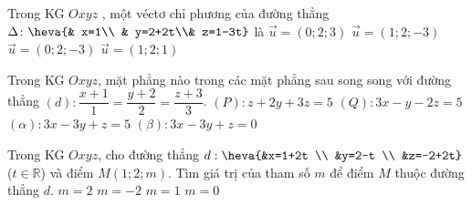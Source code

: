 \begin{ex}%
Trong KG $Oxyz$ , một véctơ chỉ phương của đường thẳng
$\Delta\colon \heva{& x=1\\ & y=2+2t\\&     z=1-3t}$ là
\choice
{$\vec{u}=\left(0;2;3\right)$}
{$\vec{u}=\left(1;2;-3\right)$}
{\True $\vec{u}=\left(0;2;-3\right)$}
{$\vec{u}=\left(1;2;1\right)$}
\end{ex}

\begin{ex}%
Trong KG $Oxyz$, mặt phẳng nào trong các mặt phẳng sau song song với đường thẳng
$(d)\colon  \dfrac{x+1}{1}=\dfrac{y+2}{2}=\dfrac{z+3}{3}$.
\choice
{$(P)\colon  z+2 y+3 z=5$}
{$(Q)\colon  3 x-y-2 z=5$}
{\True $(\alpha)\colon  3 x-3 y+z=5$}
{$(\beta)\colon  3 x-3 y+z=0$}
\end{ex}

\begin{ex}%
Trong KG $Oxyz$, cho đường thẳng $d: \heva{&x=1+2t \\ &y=2-t \\ &z=-2+2t}$ ($t\in\mathbb{R}$) và điểm $M(1;2;m)$. Tìm giá trị của tham số $m$ để điểm $M$ thuộc đường thẳng $d$.
\choice
{$m=2$}
{\True $m=-2$}
{$m=1$}
{$m=0$}
\end{ex}


